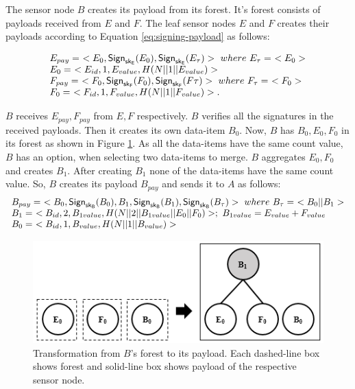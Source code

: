 	The sensor node $B$ creates its payload from its forest. 
	It's forest consists of payloads received from $E$ and $F$.
	The leaf sensor nodes $E$ and $F$ creates their payloads according to Equation \ref{eq:signing-payload} as follows:

	\begin{equation*}
		\begin{array}{l}
		E_{pay} =\ <E_{0}, \textsf{Sign}_{\sk_{E}}(E_{0}), \textsf{Sign}_{\sk_{E}}(E_{\tau}) >\ where\ E_{\tau} =\ <E_{0}>\\
		E_{0} =\ <E_{id}, 1, E_{value}, H(N||1||E_{value})>\\
		F_{pay} =\ <F_{0}, \textsf{Sign}_{\sk_{F}}(F_{0}), \textsf{Sign}_{\sk_{F}}(F{\tau}) >\ where\ F_{\tau} =\ <F_{0}>\\
		F_{0} =\ <F_{id}, 1, F_{value}, H(N||1||F_{value})>.
		\end{array}
	\end{equation*}
	
	$B$ receives $E_{pay},F_{pay}$ from $E,F$ respectively. 
	$B$ verifies all the signatures in the received payloads.
	Then it creates its own data-item $B_{0}$.
	Now, $B$ has $B_{0},E_{0},F_{0}$ in its forest as shown in Figure \ref{fig:b-forest-payload}. 
	As all the data-items have the same count value, $B$ has an option, when selecting two data-items to merge.
	$B$ aggregates $E_{0},F_{0}$ and creates $B_{1}$.
	After creating $B_{1}$ none of the data-items have the same count value. 
	So, $B$ creates its payload $B_{pay}$ and sends it to $A$ as follows:
	\begin{equation*}
		\begin{array}{l}
			B_{pay} =\ < B_{0}, \textsf{Sign}_{\sf{sk}_{B}}(B_{0}), B_{1}, \textsf{Sign}_{\sf{sk}_{B}}(B_{1}), \textsf{Sign}_{\sf{sk}_{B}}(B_{\tau}) >\ where\ B_{\tau} =\ <B_{0} || B_{1}>\\
			B_{1} =\ < B_{id}, 2, B_{1value}, H(N||2||B_{1value}||E_{0}||F_{0})>;\ B_{1value} = E_{value} + F_{value} \\
			B_{0} =\ <B_{id}, 1, B_{value}, H(N||1||B_{value})>
		\end{array}
		\label{eq:b-payload}
	\end{equation*}

	\begin{figure}[h!]
		\centering
		\includegraphics{images/b-forest-payload.png}
		\caption{Transformation from $B$'s forest to its payload.
				Each dashed-line box shows forest and solid-line box shows payload of the respective sensor node.}
		\label{fig:b-forest-payload}
	\end{figure}

